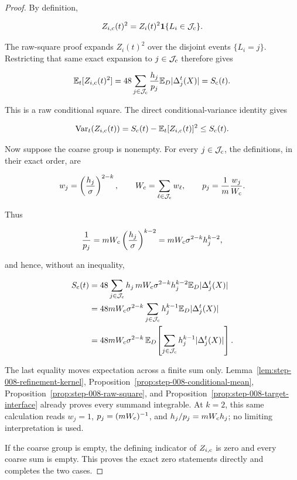 \begin{proof}
By definition,

\[
Z_{i,{\rm c}}(t)^2
=Z_i(t)^2\mathbf1\{L_i\in\mathcal J_{\rm c}\}.
\]

The raw-square proof expands \(Z_i(t)^2\) over the disjoint events
\(\{L_i=j\}\). Restricting that same exact expansion to
\(j\in\mathcal J_{\rm c}\) therefore gives

\[
\mathbb E_t[Z_{i,{\rm c}}(t)^2]
=48\sum_{j\in\mathcal J_{\rm c}}\frac{h_j}{p_j}
  \mathbb E_D|\Delta_j^t(X)|
=S_{\rm c}(t).
\]

This is a raw conditional square. The direct conditional-variance identity
gives

\[
\operatorname{Var}_t(Z_{i,{\rm c}}(t))
=S_{\rm c}(t)-\mathbb E_t[Z_{i,{\rm c}}(t)]^2
\leq S_{\rm c}(t).
\]

Now suppose the coarse group is nonempty. For every
\(j\in\mathcal J_{\rm c}\), the definitions, in their exact order, are

\[
w_j=\left(\frac{h_j}{\sigma}\right)^{2-k},
\qquad
W_{\rm c}=\sum_{\ell\in\mathcal J_{\rm c}}w_\ell,
\qquad
p_j=\frac1m\frac{w_j}{W_{\rm c}}.
\]

Thus

\[
\frac1{p_j}
=mW_{\rm c}\left(\frac{h_j}{\sigma}\right)^{k-2}
=mW_{\rm c}\sigma^{2-k}h_j^{k-2},
\]

and hence, without an inequality,

\[
\begin{aligned}
S_{\rm c}(t)
&=48\sum_{j\in\mathcal J_{\rm c}}
   h_j\,mW_{\rm c}\sigma^{2-k}h_j^{k-2}
   \mathbb E_D|\Delta_j^t(X)|\\
&=48mW_{\rm c}\sigma^{2-k}
  \sum_{j\in\mathcal J_{\rm c}}h_j^{k-1}
   \mathbb E_D|\Delta_j^t(X)|\\
&=48mW_{\rm c}\sigma^{2-k}\,
  \mathbb E_D\!\left[
    \sum_{j\in\mathcal J_{\rm c}}h_j^{k-1}
      |\Delta_j^t(X)|
  \right].
\end{aligned}
\]

The last equality moves expectation across a finite sum only. Lemma~\ref{lem:step-008-refinement-kernel}, Proposition~\ref{prop:step-008-conditional-mean}, Proposition~\ref{prop:step-008-raw-square}, and Proposition~\ref{prop:step-008-target-interface} already proves every summand integrable. At \(k=2\), this same
calculation reads \(w_j=1\), \(p_j=(mW_{\rm c})^{-1}\), and
\(h_j/p_j=mW_{\rm c}h_j\); no limiting interpretation is used.

If the coarse group is empty, the defining indicator of
\(Z_{i,{\rm c}}\) is zero and every coarse sum is empty. This proves the exact
zero statements directly and completes the two cases.
\end{proof}

